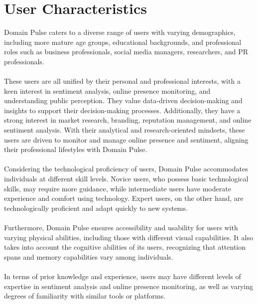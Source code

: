 \documentclass[12pt]{article}
\begin{document}
\section{User Characteristics}

Domain Pulse caters to a diverse range of users with varying demographics, including more mature age groups, educational backgrounds, and professional roles such as business professionals, social media managers, researchers, and PR professionals.\\\\
These users are all unified by their personal and professional interests, with a keen interest in sentiment analysis, online presence monitoring, and understanding public perception. They value data-driven decision-making and insights to support their decision-making processes. Additionally, they have a strong interest in market research, branding, reputation management, and online sentiment analysis. With their analytical and research-oriented mindsets, these users are driven to monitor and manage online presence and sentiment, aligning their professional lifestyles with Domain Pulse.\\\\
Considering the technological proficiency of users, Domain Pulse accommodates individuals at different skill levels. Novice users, who possess basic technological skills, may require more guidance, while intermediate users have moderate experience and comfort using technology. Expert users, on the other hand, are technologically proficient and adapt quickly to new systems.\\\\
Furthermore, Domain Pulse ensures accessibility and usability for users with varying physical abilities, including those with different visual capabilities. It also takes into account the cognitive abilities of its users, recognizing that attention spans and memory capabilities vary among individuals.\\\\
In terms of prior knowledge and experience, users may have different levels of expertise in sentiment analysis and online presence monitoring, as well as varying degrees of familiarity with similar tools or platforms.

\newpage
\end{document}

